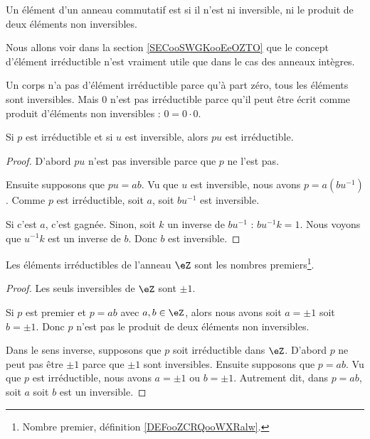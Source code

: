 \begin{definition}  \label{DeirredBDhQfA}
	Un élément d'un anneau commutatif est  si il n'est ni inversible, ni le produit de deux éléments non inversibles. 
\end{definition}

\begin{normaltext}
	Nous allons voir dans la section \ref{SECooSWGKooEeOZTO} que le concept d'élément irréductible n'est vraiment utile que dans le cas des anneaux intègres.
\end{normaltext}

\begin{example}
	Un corps n'a pas d'élément irréductible parce qu'à part zéro, tous les éléments sont inversibles. Mais \( 0\) n'est pas irréductible parce qu'il peut être écrit comme produit d'éléments non inversibles : \( 0=0\cdot 0\).
\end{example}

\begin{lemma}		\label{LEMooJBUJooScsiGc}
	Si \( p\) est irréductible et si \( u\) est inversible, alors \( pu\) est irréductible.
\end{lemma}

\begin{proof}
	D'abord \( pu\) n'est pas inversible parce que \( p\) ne l'est pas.

	Ensuite supposons que \( pu=ab\). Vu que \( u\) est inversible, nous avons \( p=a(bu^{-1})\). Comme \( p\) est irréductible, soit \( a\), soit \( bu^{-1}\) est inversible.

	Si c'est \( a\), c'est gagnée. Sinon, soit \( k\) un inverse de \( bu^{-1}\) : \( bu^{-1}k=1\). Nous voyons que \( u^{-1}k\) est un inverse de \( b\). Donc \( b\) est inversible.
\end{proof}

\begin{proposition}     \label{PROPooKDWQooTtScrN}
	Les éléments irréductibles de l'anneau \( \eZ\) sont les nombres premiers\footnote{Nombre premier, définition \ref{DEFooZCRQooWXRalw}.}.
\end{proposition}

\begin{proof}
	Les seuls inversibles de \( \eZ\) sont \( \pm 1\).

	Si \( p\) est premier et \( p=ab\) avec \( a,b\in \eZ\), alors nous avons soit \( a=\pm 1\) soit \( b=\pm 1\). Donc \( p\) n'est pas le produit de deux éléments non inversibles.

	Dans le sens inverse, supposons que \( p\) soit irréductible dans \( \eZ\). D'abord \( p\) ne peut pas être \( \pm 1\) parce que \( \pm 1\) sont inversibles. Ensuite supposons que \( p=ab\). Vu que \( p\) est irréductible, nous avons \( a=\pm1\) ou \( b=\pm1\). Autrement dit, dans \( p=ab\), soit \( a\) soit \( b\) est un inversible.
\end{proof}

